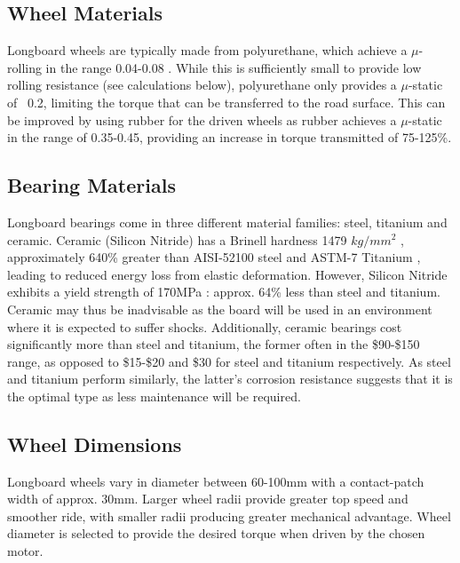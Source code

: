 \documentclass[journal,10pt]{IEEEtran}
\begin{document}
    \subsection{Wheel Materials}
        Longboard wheels are typically made from polyurethane, which achieve a $\mu$-rolling in the range 0.04-0.08 \cite{wheel_data}. While this is sufficiently small to provide low rolling resistance (see calculations below), polyurethane only provides a $\mu$-static of ~0.2, limiting the torque that can be transferred to the road surface. This can be improved by using rubber for the driven wheels as rubber achieves a $\mu$-static in the range of 0.35-0.45, providing an increase in torque transmitted of 75-125\%.
    \subsection{Bearing Materials}
        Longboard bearings come in three different material families: steel, titanium and ceramic. Ceramic (Silicon Nitride) has a Brinell hardness 1479 $kg/mm^{2}$ \cite{ceramic_data1}, approximately 640\% greater than AISI-52100 steel \cite{steel_data} and ASTM-7 Titanium \cite{titanium_data}, leading to reduced energy loss from elastic deformation.  However, Silicon Nitride exhibits a yield strength of 170MPa \cite{ceramic_data2}: approx. 64\% less than steel and titanium. Ceramic may thus be inadvisable as the board will be used in an environment where it is expected to suffer shocks. Additionally, ceramic bearings cost significantly more than steel and titanium, the former often in the \$90-\$150 range, as opposed to \$15-\$20 and \$30 for steel and titanium respectively. As steel and titanium perform similarly, the latter’s corrosion resistance suggests that it is the optimal type as less maintenance will be required. 
    \subsection{Wheel Dimensions}
        Longboard wheels vary in diameter between 60-100mm with a contact-patch width of approx. 30mm. Larger wheel radii provide greater top speed and smoother ride, with smaller radii producing greater mechanical advantage. 
        Wheel diameter is selected to provide the desired torque when driven by the chosen motor.
\end{document}

